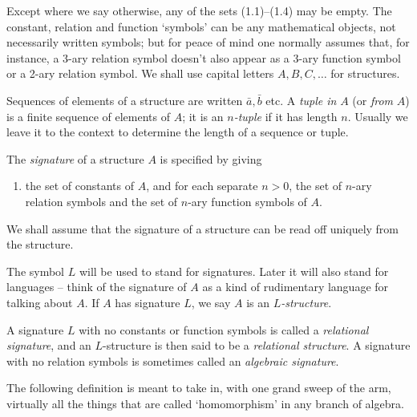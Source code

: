 Except where we say otherwise, any of the sets (1.1)--(1.4) may be empty. The constant, relation and function ‘symbols’ can be any mathematical objects, not necessarily written symbols; but for peace of mind one normally assumes that, for instance, a 3-ary relation symbol doesn’t also appear as a 3-ary function symbol or a 2-ary relation symbol. We shall use capital letters \( A, B, C, \ldots \) for structures.

Sequences of elements of a structure are written \( \bar{a}, \bar{b} \) etc. A \emph{tuple in} \( A \) (or \emph{from} \( A \)) is a finite sequence of elements of \( A \); it is an \emph{\( n \)-tuple} if it has length \( n \). Usually we leave it to the context to determine the length of a sequence or tuple.



\begin{definition}[signature]
    The \emph{signature} of a structure \( A \) is specified by giving
    \begin{enumerate}
        \item[(1.5)] the set of constants of \( A \), and for each separate \( n > 0 \), the set of \( n \)-ary relation symbols and the set of \( n \)-ary function symbols of \( A \).
    \end{enumerate}

\end{definition}



We shall assume that the signature of a structure can be read off uniquely from the structure.

The symbol \( L \) will be used to stand for signatures. Later it will also stand for languages -- think of the signature of \( A \) as a kind of rudimentary language for talking about \( A \). If \( A \) has signature \( L \), we say \( A \) is an \emph{\( L \)-structure}.

A signature \( L \) with no constants or function symbols is called a \emph{relational signature}, and an \( L \)-structure is then said to be a \emph{relational structure}. A signature with no relation symbols is sometimes called an \emph{algebraic signature}.



The following definition is meant to take in, with one grand sweep of the arm, virtually all the things that are called ‘homomorphism’ in any branch of algebra.

